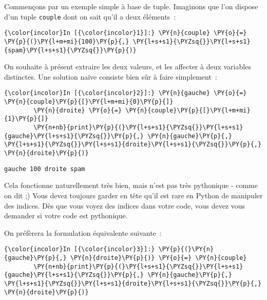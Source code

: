     Commençons par un exemple simple à base de tuple. Imaginons que l'on
dispose d'un tuple \texttt{couple} dont on sait qu'il a deux éléments~:

    \begin{Verbatim}[commandchars=\\\{\}]
{\color{incolor}In [{\color{incolor}1}]:} \PY{n}{couple} \PY{o}{=} \PY{p}{(}\PY{l+m+mi}{100}\PY{p}{,} \PY{l+s+s1}{\PYZsq{}}\PY{l+s+s1}{spam}\PY{l+s+s1}{\PYZsq{}}\PY{p}{)}
\end{Verbatim}


    On souhaite à présent extraire les deux valeurs, et les affecter à deux
variables distinctes. Une solution naïve consiste bien sûr à faire
simplement~:

    \begin{Verbatim}[commandchars=\\\{\}]
{\color{incolor}In [{\color{incolor}2}]:} \PY{n}{gauche} \PY{o}{=} \PY{n}{couple}\PY{p}{[}\PY{l+m+mi}{0}\PY{p}{]}
        \PY{n}{droite} \PY{o}{=} \PY{n}{couple}\PY{p}{[}\PY{l+m+mi}{1}\PY{p}{]}
        \PY{n+nb}{print}\PY{p}{(}\PY{l+s+s1}{\PYZsq{}}\PY{l+s+s1}{gauche}\PY{l+s+s1}{\PYZsq{}}\PY{p}{,} \PY{n}{gauche}\PY{p}{,} \PY{l+s+s1}{\PYZsq{}}\PY{l+s+s1}{droite}\PY{l+s+s1}{\PYZsq{}}\PY{p}{,} \PY{n}{droite}\PY{p}{)}
\end{Verbatim}


    \begin{Verbatim}[commandchars=\\\{\}]
gauche 100 droite spam

    \end{Verbatim}

    Cela fonctionne naturellement très bien, mais n'est pas très pythonique
- comme on dit ;) Vous devez toujours garder en tête qu'il est rare en
Python de manipuler des indices. Dès que vous voyez des indices dans
votre code, vous devez vous demander si votre code est pythonique.

On préfèrera la formulation équivalente suivante~:

    \begin{Verbatim}[commandchars=\\\{\}]
{\color{incolor}In [{\color{incolor}3}]:} \PY{p}{(}\PY{n}{gauche}\PY{p}{,} \PY{n}{droite}\PY{p}{)} \PY{o}{=} \PY{n}{couple}
        \PY{n+nb}{print}\PY{p}{(}\PY{l+s+s1}{\PYZsq{}}\PY{l+s+s1}{gauche}\PY{l+s+s1}{\PYZsq{}}\PY{p}{,} \PY{n}{gauche}\PY{p}{,} \PY{l+s+s1}{\PYZsq{}}\PY{l+s+s1}{droite}\PY{l+s+s1}{\PYZsq{}}\PY{p}{,} \PY{n}{droite}\PY{p}{)}
\end{Verbatim}


